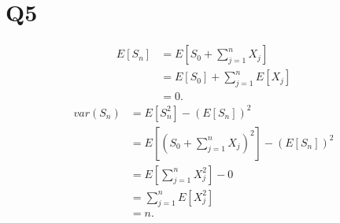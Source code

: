 \documentclass[final,3p,times]{elsarticle}
\begin{document}
\section{Q5}
	\begin{equation}
		\begin{split}
			E[S_n]&=E[S_0+\sum_{j=1}^{n} X_j] \\
			&=E[S_0]+\sum_{j=1}^{n} E[X_j] \\
			&=0
			.
		\end{split}
	\end{equation}
	\begin{equation}
		\begin{split}
			var(S_n)&=E[S_n^2]-\left(E[S_n]\right)^2 \\
			&=E[\left(S_0+\sum_{j=1}^{n}X_j\right)^2]-\left(E[S_n]\right)^2 \\
			&=E[\sum_{j=1}^{n} X_j^2] - 0 \\
			&=\sum_{j=1}^{n} E[X_j^2] \\
			&= n
			.
		\end{split}
	\end{equation}
	
\end{document}
